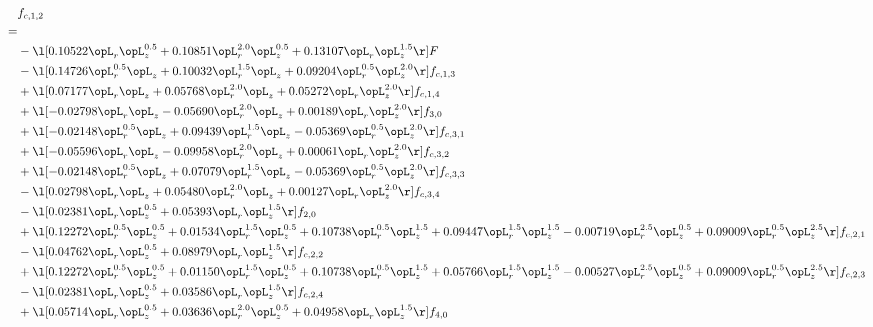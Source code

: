 \begin{alignat}{2} 
\label{eq:f_12_2} 
& f_{c,1,2} \nonumber \\ 
 = \\ 
& - \l[  0.10522 \opL_r \opL_z^{0.5} +  0.10851 \opL_r^{2.0} \opL_z^{0.5} +  0.13107 \opL_r \opL_z^{1.5}  \r] F \nonumber \\ 
& - \l[  0.14726 \opL_r^{0.5} \opL_z +  0.10032 \opL_r^{1.5} \opL_z +  0.09204 \opL_r^{0.5} \opL_z^{2.0}  \r] f_{c,1,3} \nonumber \\ 
& + \l[  0.07177 \opL_r \opL_z +  0.05768 \opL_r^{2.0} \opL_z +  0.05272 \opL_r \opL_z^{2.0}  \r] f_{c,1,4} \nonumber \\ 
& + \l[  -0.02798 \opL_r \opL_z   -0.05690 \opL_r^{2.0} \opL_z +  0.00189 \opL_r \opL_z^{2.0}  \r] f_{3,0} \nonumber \\ 
& + \l[  -0.02148 \opL_r^{0.5} \opL_z +  0.09439 \opL_r^{1.5} \opL_z   -0.05369 \opL_r^{0.5} \opL_z^{2.0}  \r] f_{c,3,1} \nonumber \\ 
& + \l[  -0.05596 \opL_r \opL_z   -0.09958 \opL_r^{2.0} \opL_z +  0.00061 \opL_r \opL_z^{2.0}  \r] f_{c,3,2} \nonumber \\ 
& + \l[  -0.02148 \opL_r^{0.5} \opL_z +  0.07079 \opL_r^{1.5} \opL_z   -0.05369 \opL_r^{0.5} \opL_z^{2.0}  \r] f_{c,3,3} \nonumber \\ 
& - \l[  0.02798 \opL_r \opL_z +  0.05480 \opL_r^{2.0} \opL_z +  0.00127 \opL_r \opL_z^{2.0}  \r] f_{c,3,4} \nonumber \\ 
& - \l[  0.02381 \opL_r \opL_z^{0.5} +  0.05393 \opL_r \opL_z^{1.5}  \r] f_{2,0} \nonumber \\ 
& + \l[  0.12272 \opL_r^{0.5} \opL_z^{0.5} +  0.01534 \opL_r^{1.5} \opL_z^{0.5} +  0.10738 \opL_r^{0.5} \opL_z^{1.5} +  0.09447 \opL_r^{1.5} \opL_z^{1.5}   -0.00719 \opL_r^{2.5} \opL_z^{0.5} +  0.09009 \opL_r^{0.5} \opL_z^{2.5}  \r] f_{c,2,1} \nonumber \\ 
& - \l[  0.04762 \opL_r \opL_z^{0.5} +  0.08979 \opL_r \opL_z^{1.5}  \r] f_{c,2,2} \nonumber \\ 
& + \l[  0.12272 \opL_r^{0.5} \opL_z^{0.5} +  0.01150 \opL_r^{1.5} \opL_z^{0.5} +  0.10738 \opL_r^{0.5} \opL_z^{1.5} +  0.05766 \opL_r^{1.5} \opL_z^{1.5}   -0.00527 \opL_r^{2.5} \opL_z^{0.5} +  0.09009 \opL_r^{0.5} \opL_z^{2.5}  \r] f_{c,2,3} \nonumber \\ 
& - \l[  0.02381 \opL_r \opL_z^{0.5} +  0.03586 \opL_r \opL_z^{1.5}  \r] f_{c,2,4} \nonumber \\ 
& + \l[  0.05714 \opL_r \opL_z^{0.5} +  0.03636 \opL_r^{2.0} \opL_z^{0.5} +  0.04958 \opL_r \opL_z^{1.5}  \r] f_{4,0} \nonumber \\ 

\end{alignat}
